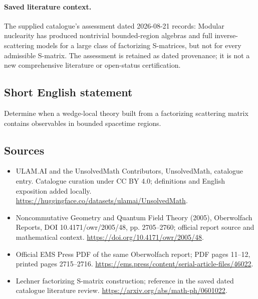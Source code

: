 \documentclass[11pt]{article}
\begin{document}
\paragraph{Saved literature context.} The supplied catalogue's assessment dated 2026-08-21 records: Modular nuclearity has produced nontrivial bounded-region algebras and full inverse-scattering models for a large class of factorizing S-matrices, but not for every admissible S-matrix. The assessment is retained as dated provenance; it is not a new comprehensive literature or open-status certification.
\subsection{Short English statement}
Determine when a wedge-local theory built from a factorizing scattering matrix contains observables in bounded spacetime regions.
\subsection{Sources}
\begin{itemize}
\item[\hypertarget{source:statement:1}{S1}] ULAM.AI and the UnsolvedMath Contributors, UnsolvedMath, catalogue entry. Catalogue curation under CC BY 4.0; definitions and English exposition added locally.
\url{https://huggingface.co/datasets/ulamai/UnsolvedMath}.
\item[\hypertarget{source:statement:2}{S2}] Noncommutative Geometry and Quantum Field Theory (2005), Oberwolfach Reports, DOI 10.4171/owr/2005/48, pp. 2705--2760; official report source and mathematical context.
\url{https://doi.org/10.4171/owr/2005/48}.
\item[\hypertarget{source:statement:3}{S3}] Official EMS Press PDF of the same Oberwolfach report; PDF pages 11--12, printed pages 2715--2716.
\url{https://ems.press/content/serial-article-files/46022}.
\item[\hypertarget{source:statement:4}{S4}] Lechner factorizing S-matrix construction; reference in the saved dated catalogue literature review.
\url{https://arxiv.org/abs/math-ph/0601022}.
\end{itemize}
\label{end:statement}
\end{document}
